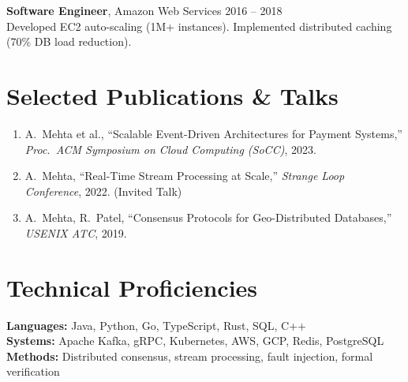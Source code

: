 \documentclass[11pt,letterpaper]{article}
\begin{document}
\vspace{6pt}
\noindent\textbf{Software Engineer}, Amazon Web Services \hfill 2016 -- 2018\\
{\small Developed EC2 auto-scaling (1M+ instances). Implemented distributed caching (70\% DB load reduction).}


\section{Selected Publications \& Talks}

\begin{enumerate}[leftmargin=1.5em, topsep=2pt, itemsep=3pt]
  \item A.\ Mehta et al., ``Scalable Event-Driven Architectures for Payment Systems,'' \textit{Proc.\ ACM Symposium on Cloud Computing (SoCC)}, 2023.
  \item A.\ Mehta, ``Real-Time Stream Processing at Scale,'' \textit{Strange Loop Conference}, 2022. (Invited Talk)
  \item A.\ Mehta, R.\ Patel, ``Consensus Protocols for Geo-Distributed Databases,'' \textit{USENIX ATC}, 2019.
\end{enumerate}

\section{Technical Proficiencies}

\noindent\textbf{Languages:} Java, Python, Go, TypeScript, Rust, SQL, C++ \\
\textbf{Systems:} Apache Kafka, gRPC, Kubernetes, AWS, GCP, Redis, PostgreSQL \\
\textbf{Methods:} Distributed consensus, stream processing, fault injection, formal verification
\end{document}
